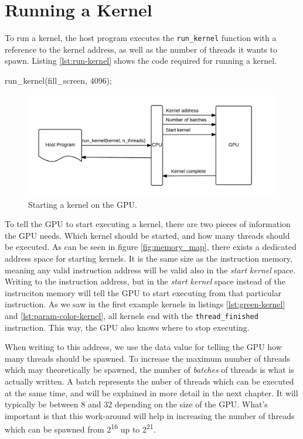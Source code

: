 \section{Running a Kernel}
To run a kernel, the host program executes the \verb/run_kernel/ function with a reference to the kernel address, as well as the number of threads it wants to spawn.
Listing \ref{lst:run-kernel} shows the code required for running a kernel.

\begin{c-code}[caption=Running a kernel, label=lst:run-kernel]
run_kernel(fill_screen, 4096);
\end{c-code}

\begin{figure}[H]
    \centering
    \includegraphics[width=\textwidth]{../cpu/diagrams/running_a_kernel.png}
    \caption{Starting a kernel on the GPU.}
    \label{fig:running_a_kernel}
\end{figure}

To tell the GPU to start executing a kernel,
there are two pieces of information the GPU needs.
Which kernel should be started, and how many threads should be executed.
As can be seen in figure \ref{fig:memory_map}, there exists a dedicated address space for starting kernels.
It is the same size as the instruction memory,
meaning any valid instruction address will be valid also in the \emph{start kernel} space.
Writing to the instruction address,
but in the \emph{start kernel} space instead of the instruciton memory will tell the GPU to start executing from that particular instruction.
As we saw in the first example kernels in listings \ref{lst:green-kernel} and \ref{lst:param-color-kernel}, all kernels end with the \verb/thread_finished/ instruction.
This way, the GPU also knows where to stop executing.

When writing to this address, we use the data value for telling the GPU how many threads should be spawned.
To increase the maximum number of threads which may theoretically be spawned,
the number of \emph{batches} of threads is what is actually written.
A batch represents the nuber of threads which can be executed at the same time,
and will be explained in more detail in the next chapter. 
It will typically be between 8 and 32 depending on the size of the GPU.
What's important is that this work-around will help in increasing the number of threads which can be spawned from 2\textsuperscript{16} up to 2\textsuperscript{21}.

